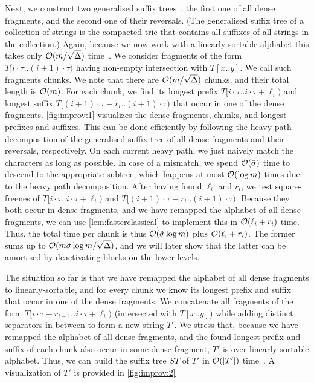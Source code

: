 Next, we construct two generalised suffix trees~\cite{Gusfield1997}, the first one of all dense fragments, and the second one of their reversals. 
(The generalised suffix tree of a collection of strings is the compacted trie that contains all suffixes of all strings in the collection.)
Again, because we
now work with a linearly-sortable alphabet this takes only $\mathcal{O}(m/\sqrt{\Delta})$ time~\cite{Farach1997}. We consider fragments
of the form $T[i\cdot \tau .. (i+1)\cdot \tau)$ having non-empty intersection with $T[x..y]$. We call such fragments chunks.
We note that there are $\mathcal{O}(m/\sqrt{\Delta})$ chunks, and their total length is $\mathcal{O}(m)$.
For each chunk, we find its longest prefix $T[i\cdot \tau.. i\cdot \tau+\ell_{i})$ and
longest suffix $T[(i+1)\cdot \tau-r_{i} .. (i+1)\cdot \tau)$ that occur in one of the dense fragments.
\cref{fig:improv:1} visualizes the dense fragments, chunks, and longest prefixes and suffixes.
This can be done efficiently by following the heavy path decomposition of the generalised suffix tree of all dense fragments
and their reversals, respectively. On each current heavy path, we just naively match the characters as long as possible.
In case
of a mismatch, we spend $\mathcal{O}(\tilde{\sigma})$ time to descend to the appropriate subtree, which happens at most $\mathcal{O}(\log m)$ times due to the heavy path decomposition.
After having found $\ell_{i}$ and $r_{i}$, we test square-freenes of $T[i\cdot \tau.. i\cdot \tau+\ell_{i})$
and $T[(i+1)\cdot \tau-r_{i} .. (i+1)\cdot \tau)$. Because they both occur in dense fragments,
and we have remapped the alphabet of all dense fragments, we can use \cref{lem:fasterclassical} to implement
this in $\mathcal{O}(\ell_{i}+r_{i})$ time.
Thus, the total time per chunk is thus $\mathcal{O}(\tilde{\sigma}\log m)$ plus $\mathcal{O}(\ell_{i}+r_{i})$. The former sums up to
$\mathcal{O}(m\tilde{\sigma}\log m/\sqrt{\Delta})$, and we will later show that the latter can be amortised by deactivating blocks on the lower levels.

The situation so far is that we have remapped the alphabet of all dense fragments to linearly-sortable, and for every chunk we know its longest
prefix and suffix that occur in one of the dense fragments. We concatenate 
all fragments of the form $T[i\cdot \tau-r_{i-1} .. i\cdot \tau+\ell_{i})$ (intersected with $T[x..y]$) while adding distinct separators
in between to form a new string $T'$. 
We stress that, because we have remapped the alphabet of all dense fragments, and the found
longest prefix and suffix of each chunk also occur in some dense fragment,  $T'$ is over linearly-sortable alphabet. 
Thus, we can build the suffix tree $ST$ of $T'$ in $\mathcal{O}(|T'|)$ time~\cite{Farach1997}. 
A visualization of $T'$ is provided in \cref{fig:improv:2}

